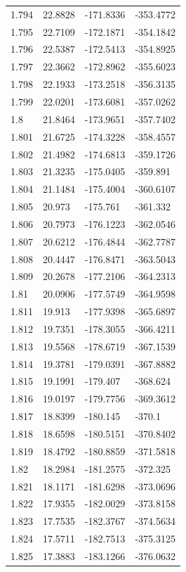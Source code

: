 \begin{tabular}{llll}
1.794 & 22.8828 & -171.8336 & -353.4772 \\
1.795 & 22.7109 & -172.1871 & -354.1842 \\
1.796 & 22.5387 & -172.5413 & -354.8925 \\
1.797 & 22.3662 & -172.8962 & -355.6023 \\
1.798 & 22.1933 & -173.2518 & -356.3135 \\
1.799 & 22.0201 & -173.6081 & -357.0262 \\
1.8 & 21.8464 & -173.9651 & -357.7402 \\
1.801 & 21.6725 & -174.3228 & -358.4557 \\
1.802 & 21.4982 & -174.6813 & -359.1726 \\
1.803 & 21.3235 & -175.0405 & -359.891 \\
1.804 & 21.1484 & -175.4004 & -360.6107 \\
1.805 & 20.973 & -175.761 & -361.332 \\
1.806 & 20.7973 & -176.1223 & -362.0546 \\
1.807 & 20.6212 & -176.4844 & -362.7787 \\
1.808 & 20.4447 & -176.8471 & -363.5043 \\
1.809 & 20.2678 & -177.2106 & -364.2313 \\
1.81 & 20.0906 & -177.5749 & -364.9598 \\
1.811 & 19.913 & -177.9398 & -365.6897 \\
1.812 & 19.7351 & -178.3055 & -366.4211 \\
1.813 & 19.5568 & -178.6719 & -367.1539 \\
1.814 & 19.3781 & -179.0391 & -367.8882 \\
1.815 & 19.1991 & -179.407 & -368.624 \\
1.816 & 19.0197 & -179.7756 & -369.3612 \\
1.817 & 18.8399 & -180.145 & -370.1 \\
1.818 & 18.6598 & -180.5151 & -370.8402 \\
1.819 & 18.4792 & -180.8859 & -371.5818 \\
1.82 & 18.2984 & -181.2575 & -372.325 \\
1.821 & 18.1171 & -181.6298 & -373.0696 \\
1.822 & 17.9355 & -182.0029 & -373.8158 \\
1.823 & 17.7535 & -182.3767 & -374.5634 \\
1.824 & 17.5711 & -182.7513 & -375.3125 \\
1.825 & 17.3883 & -183.1266 & -376.0632 \\

\end{tabular}
